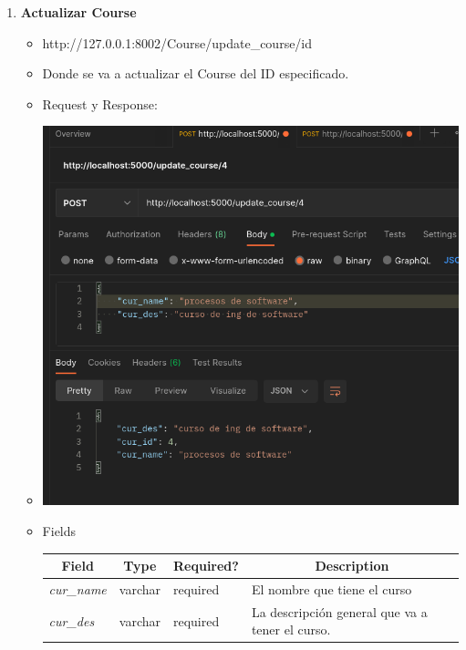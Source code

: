 \documentclass{article}
\begin{document}
\begin{enumerate}
    \item \textbf{Actualizar Course}
    \begin{itemize}
        \item http://127.0.0.1:8002/Course/update\_course/id
        \item Donde se va a actualizar el Course del ID especificado.
        \item Request y Response:
        \item \includegraphics[scale=.5]{assets/course/update.png}
        \item Fields
        \begin{table}[H] \centering \begin{tabular}{|l|l|l|l|} \hline
        \multicolumn{1}{|c|}{\textbf{Field}} &
        \multicolumn{1}{c|}{\textbf{Type}} &
        \multicolumn{1}{c|}{\textbf{Required?}} &
        \multicolumn{1}{c|}{\textbf{Description}} \\ \hline \textit{cur\_name} &
        varchar & required & El nombre que tiene el curso \\ \hline
        \textit{cur\_des} & varchar & required & La descripción general que va a
        tener el curso. \\ \hline \end{tabular} \end{table}


\end{itemize}
\end{enumerate}
\end{document}
